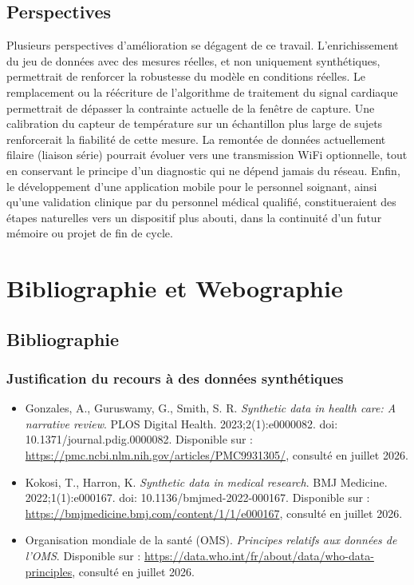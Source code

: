 \documentclass[12pt,a4paper]{report}
\begin{document}
\section{Perspectives}
Plusieurs perspectives d'amélioration se dégagent de ce travail. L'enrichissement du jeu de données avec des mesures réelles, et non uniquement synthétiques, permettrait de renforcer la robustesse du modèle en conditions réelles. Le remplacement ou la réécriture de l'algorithme de traitement du signal cardiaque permettrait de dépasser la contrainte actuelle de la fenêtre de capture. Une calibration du capteur de température sur un échantillon plus large de sujets renforcerait la fiabilité de cette mesure. La remontée de données actuellement filaire (liaison série) pourrait évoluer vers une transmission WiFi optionnelle, tout en conservant le principe d'un diagnostic qui ne dépend jamais du réseau. Enfin, le développement d'une application mobile pour le personnel soignant, ainsi qu'une validation clinique par du personnel médical qualifié, constitueraient des étapes naturelles vers un dispositif plus abouti, dans la continuité d'un futur mémoire ou projet de fin de cycle.


\chapter{Bibliographie et Webographie}

\section*{Bibliographie}

\subsection*{Justification du recours à des données synthétiques}
\begin{itemize}
    \item Gonzales, A., Guruswamy, G., Smith, S. R. \textit{Synthetic data in health care: A narrative review}. PLOS Digital Health. 2023;2(1):e0000082. doi: 10.1371/journal.pdig.0000082. Disponible sur : \url{https://pmc.ncbi.nlm.nih.gov/articles/PMC9931305/}, consulté en juillet 2026.
    \item Kokosi, T., Harron, K. \textit{Synthetic data in medical research}. BMJ Medicine. 2022;1(1):e000167. doi: 10.1136/bmjmed-2022-000167. Disponible sur : \url{https://bmjmedicine.bmj.com/content/1/1/e000167}, consulté en juillet 2026.
    \item Organisation mondiale de la santé (OMS). \textit{Principes relatifs aux données de l'OMS}. Disponible sur : \url{https://data.who.int/fr/about/data/who-data-principles}, consulté en juillet 2026.
\end{itemize}
\end{document}
